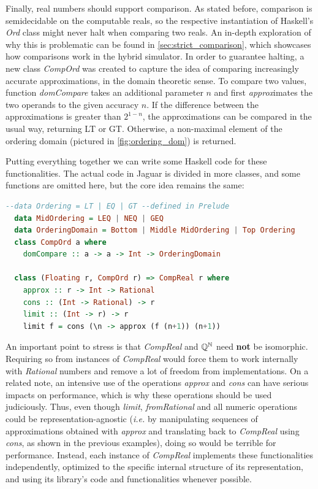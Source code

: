 Finally, real numbers should support comparison. As stated before, comparison is semidecidable on the computable reals, so the respective instantiation of Haskell's \textit{Ord} class might never halt when comparing two reals. An in-depth exploration of why this is problematic can be found in \cref{sec:strict_comparison}, which showcases how comparisons work in the hybrid simulator. In order to guarantee halting, a new class \textit{CompOrd} was created to capture the idea of comparing increasingly accurate approximations, in the domain theoretic sense. To compare two values, function \textit{domCompare} takes an additional parameter $n$ and first \textit{approx}imates the two operands to the given accuracy $n$. If the difference between the approximations is greater than $2^{1-n}$, the approximations can be compared in the usual way, returning LT or GT. Otherwise, a non-maximal element of the ordering domain (pictured in \cref{fig:ordering_dom}) is returned.

Putting everything together we can write some Haskell code for these functionalities. The actual code in Jaguar is divided in more classes, and some functions are omitted here, but the core idea remains the same:

\begin{lstlisting}[language=haskell,caption=Haskell code for \textit{CompReal} class]
  --data Ordering = LT | EQ | GT --defined in Prelude
  data MidOrdering = LEQ | NEQ | GEQ
  data OrderingDomain = Bottom | Middle MidOrdering | Top Ordering
  class CompOrd a where
    domCompare :: a -> a -> Int -> OrderingDomain
  
  class (Floating r, CompOrd r) => CompReal r where
    approx :: r -> Int -> Rational
    cons :: (Int -> Rational) -> r
    limit :: (Int -> r) -> r
    limit f = cons (\n -> approx (f (n+1)) (n+1))
\end{lstlisting}

An important point to stress is that \textit{CompReal} and $\mathbb{Q}^{\mathbb{N}}$ need \textbf{not} be isomorphic. Requiring so from instances of \textit{CompReal} would force them to work internally with \textit{Rational} numbers and remove a lot of freedom from implementations. On a related note, an intensive use of the operations \textit{approx} and \textit{cons} can have serious impacts on performance, which is why these operations should be used judiciously. Thus, even though \textit{limit}, \textit{fromRational} and all numeric operations could be representation-agnostic (\textit{i.e.} by manipulating sequences of approximations obtained with \textit{approx} and translating back to \textit{CompReal} using \textit{cons}, as shown in the previous examples), doing so would be terrible for performance. Instead, each instance of \textit{CompReal} implements these functionalities independently, optimized to the specific internal structure of its representation, and using its library's code and functionalities whenever possible.

